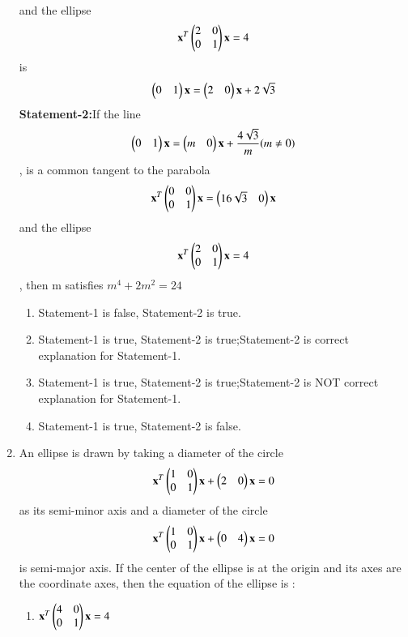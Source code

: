 \begin{enumerate}[label=\arabic*.,ref=\thesubsection.\theenumi]
\begin{align}
    \end{align} and the ellipse 
    \begin{align}
    \mathbf{x}^T\begin{pmatrix}2&0\\0&1\end{pmatrix}\mathbf{x}=4
    \end{align} is 
    \begin{align}
    \begin{pmatrix}0&1\end{pmatrix}\mathbf{x}=\begin{pmatrix}2&0\end{pmatrix}\mathbf{x}+2\sqrt{3}
    \end{align}
    \textbf{Statement-2:}If the line
    \begin{align}
    \begin{pmatrix}0&1\end{pmatrix}\mathbf{x}=\begin{pmatrix}m&0\end{pmatrix}\mathbf{x}+\frac{4\sqrt{3}}{m} (m \neq 0)
    \end{align}, is a common tangent to the parabola 
    \begin{align}
    \mathbf{x}^T\begin{pmatrix}0&0\\0&1\end{pmatrix}\mathbf{x}=\begin{pmatrix}16\sqrt{3}&0\end{pmatrix}\mathbf{x}
    \end{align} and the ellipse 
    \begin{align}
    \mathbf{x}^T\begin{pmatrix}2&0\\0&1\end{pmatrix}\mathbf{x}=4
    \end{align}, then m satisfies $m^4+2m^2=24$
    \begin{enumerate}
    \item Statement-1 is false, Statement-2 is true.
    \item Statement-1 is true, Statement-2 is true;Statement-2 is correct explanation for Statement-1.
    \item Statement-1 is true, Statement-2 is true;Statement-2 is NOT correct explanation for Statement-1.
    \item Statement-1 is true, Statement-2 is false.
    \end{enumerate} 
    \item An ellipse is drawn by taking a diameter of the circle 
    \begin{align}
    \mathbf{x}^T\begin{pmatrix}1&0\\0&1\end{pmatrix}\mathbf{x}+\begin{pmatrix}2&0\end{pmatrix}\mathbf{x}=0
    \end{align} as its semi-minor axis and a diameter of the circle 
    \begin{align}
    \mathbf{x}^T\begin{pmatrix}1&0\\0&1\end{pmatrix}\mathbf{x}+\begin{pmatrix}0&4\end{pmatrix}\mathbf{x}=0
    \end{align} is semi-major axis. If the center of the ellipse is at the origin and its axes are the coordinate axes, then the equation of the ellipse is :
    \begin{enumerate}
    \item $\mathbf{x}^T\begin{pmatrix}4&0\\0&1\end{pmatrix}\mathbf{x}=4$

\end{enumerate}
\end{enumerate}
